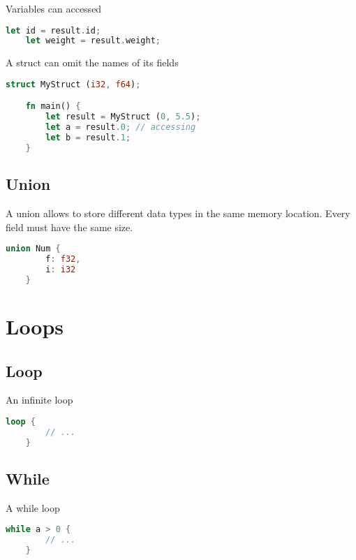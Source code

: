 \documentclass[a4paper]{article}
\begin{document}
Variables can accessed

\begin{lstlisting}[language=Rust, style=boxed, numbers=none]
    let id = result.id;
    let weight = result.weight;
\end{lstlisting}

A struct can omit the names of its fields

\begin{lstlisting}[language=Rust, style=boxed, numbers=none]
    struct MyStruct (i32, f64);

    fn main() {
        let result = MyStruct (0, 5.5);
        let a = result.0; // accessing
        let b = result.1;
    }
\end{lstlisting}

\subsection{Union}

A union allows to store different data types
in the same memory location. Every field must have
the same size.

\begin{lstlisting}[language=Rust, style=boxed, numbers=none]
    union Num {
        f: f32,
        i: i32
    }
\end{lstlisting}

\pagebreak

\section{Loops}

\subsection{Loop}

An infinite loop

\begin{lstlisting}[language=Rust, style=boxed, numbers=none]
    loop {
        // ...
    }
\end{lstlisting}

\subsection{While}

A while loop

\begin{lstlisting}[language=Rust, style=boxed, numbers=none]
    while a > 0 {
        // ...
    }
\end{lstlisting}
\end{document}
